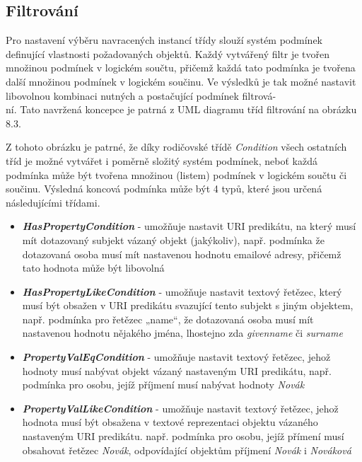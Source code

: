 \documentclass{projekt}
\begin{document}
\subsection{Filtrování}
\hspace{0.65cm}Pro nastavení výběru navracených instancí třídy slouží systém podmínek definující vlastnosti požadovaných objektů. Každý vytvářený filtr je tvořen množinou podmínek v logickém součtu, přičemž každá tato podmínka je tvořena další množinou podmínek v logickém součinu. Ve výsledků je tak možné nastavit libovolnou kombinaci nutných a postačující podmínek filtrová-\\ní. Tato navržená koncepce je patrná z UML diagramu tříd filtrování na obrázku 8.3.

Z tohoto obrázku je patrné, že díky rodičovské třídě {\it Condition} všech ostatních tříd je možné vytvářet i poměrně složitý systém podmínek, neboť každá podmínka může být tvořena množinou (listem) podmínek v logickém součtu či součinu. Výsledná koncová podmínka může být 4 typů, které jsou určená následujícími třídami.

\begin{itemize}
\item {\it \bf HasPropertyCondition} - umožňuje nastavit URI predikátu, na který musí mít dotazovaný 
subjekt vázaný objekt (jakýkoliv), např. podmínka že dotazovaná osoba musí mít nastavenou hodnotu emailové adresy, přičemž tato hodnota může být libovolná

\item {\it \bf HasPropertyLikeCondition} - umožňuje nastavit textový řetězec, který musí být obsažen v URI predikátu svazující tento subjekt s jiným objektem, např. podmínka pro řetězec „name“, že dotazovaná osoba musí mít nastavenou hodnotu nějakého jména, lhostejno zda {\it givenname} či {\it surname}
\item {\it \bf PropertyValEqCondition} - umožňuje nastavit textový řetězec, jehož hodnoty musí nabývat objekt vázaný nastaveným URI predikátu, např. podmínka pro osobu, jejíž příjmení musí nabývat hodnoty {\it Novák}
\item {\it \bf PropertyValLikeCondition} - umožňuje nastavit textový řetězec, jehož hodnota musí být obsažena v textové reprezentaci objektu vázaného nastaveným URI predikátu. např. podmínka pro osobu, jejíž přímení musí obsahovat řetězec {\it Novák}, odpovídající objektům příjmení {\it Novák} i {\it Nováková}
\end{itemize}
\end{document}
